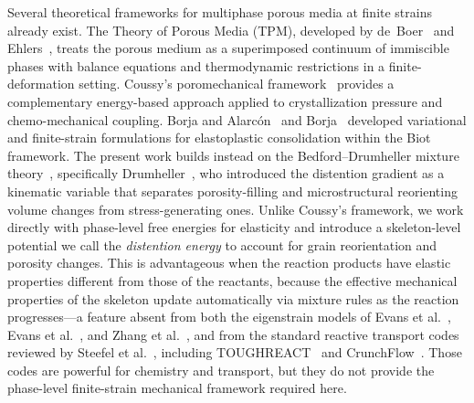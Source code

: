 \documentclass[11pt]{article}
\begin{document}
Several theoretical frameworks for multiphase porous media at finite strains already exist. The Theory of Porous Media (TPM), developed by de~Boer~\cite{deboer2000theory} and Ehlers~\cite{ehlers2002foundations,ehlers2017challenges}, treats the porous medium as a superimposed continuum of immiscible phases with balance equations and thermodynamic restrictions in a finite-deformation setting. Coussy's poromechanical framework~\cite{coussy2004poromechanics,coussy2006deformation} provides a complementary energy-based approach applied to crystallization pressure and chemo-mechanical coupling. Borja and Alarc\'on~\cite{borja1995mathematical} and Borja~\cite{borja2006mechanical} developed variational and finite-strain formulations for elastoplastic consolidation within the Biot framework. The present work builds instead on the Bedford--Drumheller mixture theory~\cite{drumheller1980thermomechanical}, specifically Drumheller~\cite{drumheller2000}, who introduced the distention gradient as a kinematic variable that separates porosity-filling and microstructural reorienting volume changes from stress-generating ones. Unlike Coussy's framework, we work directly with phase-level free energies for elasticity and introduce a skeleton-level potential we call the \emph{distention energy} to account for grain reorientation and porosity changes. This is advantageous when the reaction products have elastic properties different from those of the reactants, because the effective mechanical properties of the skeleton update automatically via mixture rules as the reaction progresses---a feature absent from both the eigenstrain models of Evans et al.~\cite{evans2018}, Evans et al.~\cite{evans2020phasefield}, and Zhang et al.~\cite{zhang2025}, and from the standard reactive transport codes reviewed by Steefel et al.~\cite{steefel2015rt}, including TOUGHREACT~\cite{xu2011toughreact} and CrunchFlow~\cite{steefel1994crunch}. Those codes are powerful for chemistry and transport, but they do not provide the phase-level finite-strain mechanical framework required here.
\end{document}
